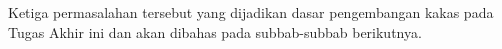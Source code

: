 Ketiga permasalahan tersebut yang dijadikan dasar pengembangan kakas pada Tugas Akhir ini dan akan dibahas pada subbab-subbab berikutnya. 




